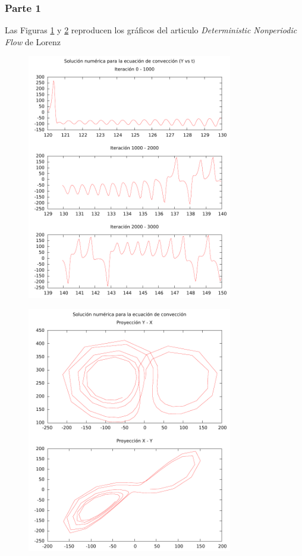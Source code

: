 \subsubsection{Parte 1}
Las Figuras \ref{lorenz1} y \ref{lorenz2} reproducen los gráficos del articulo \textit{Deterministic Nonperiodic Flow} de Lorenz
\begin{figure} [H]
\begin{center}
\includegraphics[width=0.8\textwidth]{./parte4/graficos/FIGURA1.pdf}
\caption{} \label{lorenz1}
\end{center}
\end{figure}

\begin{figure} [H]
\begin{center}
\includegraphics[width=0.8\textwidth]{./parte4/graficos/FIGURA2.pdf}
\caption{} \label{lorenz2}
\end{center}
\end{figure}

